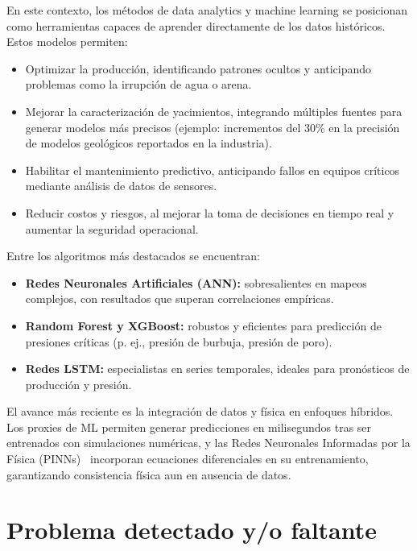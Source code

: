 \documentclass[12pt,a4paper]{article}
\begin{document}
En este contexto, los métodos de data analytics y machine learning se posicionan como herramientas capaces
de aprender directamente de los datos históricos. Estos modelos permiten:

\begin{itemize}
  \item Optimizar la producción, identificando patrones ocultos y anticipando problemas como la irrupción
  de agua o arena.
  \item Mejorar la caracterización de yacimientos, integrando múltiples fuentes para generar modelos más
  precisos (ejemplo: incrementos del 30\% en la precisión de modelos geológicos reportados en la
  industria).
  \item Habilitar el mantenimiento predictivo, anticipando fallos en equipos críticos mediante análisis de
  datos de sensores.
  \item Reducir costos y riesgos, al mejorar la toma de decisiones en tiempo real y aumentar la seguridad
  operacional.
\end{itemize}

Entre los algoritmos más destacados se encuentran:

\begin{itemize}
  \item \textbf{Redes Neuronales Artificiales (ANN):} sobresalientes en mapeos complejos, con resultados
  que superan correlaciones empíricas.
  \item \textbf{Random Forest y XGBoost:} robustos y eficientes para predicción de presiones críticas
  (p. ej., presión de burbuja, presión de poro).
  \item \textbf{Redes LSTM:} especialistas en series temporales, ideales para pronósticos de producción y presión.
\end{itemize}

El avance más reciente es la integración de datos y física en enfoques híbridos. Los proxies de ML permiten
generar predicciones en milisegundos tras ser entrenados con simulaciones numéricas, y las Redes
Neuronales Informadas por la Física (PINNs)~\cite{ref6} incorporan ecuaciones diferenciales en su
entrenamiento, garantizando consistencia física aun en ausencia de datos.

\newpage
\section{Problema detectado y/o faltante}
\end{document}
